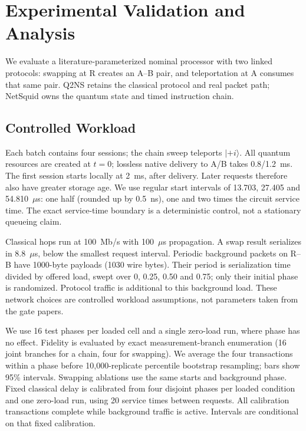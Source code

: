 \section{Experimental Validation and Analysis}
\label{sec:eval}
We evaluate a literature-parameterized nominal processor with two linked
protocols: swapping at R creates an A--B pair, and teleportation at A
consumes that same pair. Q2NS retains the classical protocol and real
packet path; NetSquid owns the quantum state and timed instruction chain.


\subsection{Controlled Workload}
Each batch contains four sessions; the chain sweep teleports $|+i\rangle$.
All quantum resources are created at
$t=0$; lossless native delivery to A/B takes 0.8/1.2~ms. The first session
starts locally at 2~ms, after delivery. Later requests therefore also
have greater storage age. We use regular start intervals of 13.703,
27.405 and 54.810~$\mu$s: one half (rounded up by 0.5~ns), one and two
times the circuit service time. The exact service-time boundary is a
deterministic control, not a stationary queueing claim.

Classical hops run at 100~Mb/s with 100~$\mu$s propagation. A swap result
serializes in 8.8~$\mu$s, below the smallest request interval. Periodic
background packets on R--B have 1000-byte payloads (1030 wire bytes).
Their period is serialization time divided by offered load, swept over
0, 0.25, 0.50 and 0.75; only their initial phase is randomized. Protocol
traffic is additional to this background load. These network choices are
controlled workload assumptions, not parameters taken from the gate papers.

We use 16 test phases per loaded cell and a single zero-load run, where
phase has no effect. Fidelity is evaluated by exact measurement-branch
enumeration (16 joint branches for a chain, four for swapping). We average
the four transactions within a phase before 10,000-replicate percentile
bootstrap resampling; bars show 95\% intervals. Swapping ablations use the
same starts and background phase. Fixed classical delay is calibrated
from four disjoint phases per loaded condition and one zero-load run,
using 20 service times between requests. All calibration transactions
complete while background traffic is active. Intervals are conditional
on that fixed calibration.

